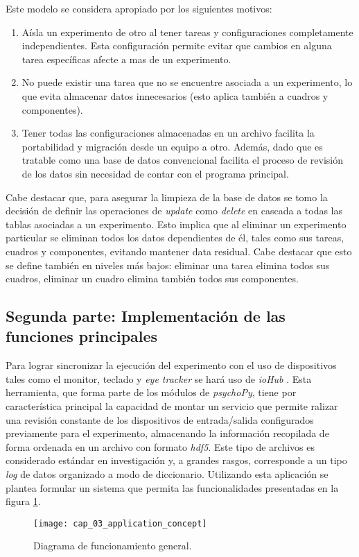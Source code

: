 \documentclass[\main/main.tex]{subfiles}
\begin{document}
			Este modelo se considera apropiado por los siguientes motivos:
			\begin{enumerate}\setlength\itemsep{-0.5em}
				\item Aísla un experimento de otro al tener tareas y configuraciones completamente independientes. Esta configuración permite evitar que cambios en alguna tarea específicas afecte a mas de un experimento.

				\item No puede existir una tarea que no se encuentre asociada a un experimento, lo que evita almacenar datos innecesarios (esto aplica también a cuadros y componentes). 

				\item Tener todas las configuraciones almacenadas en un archivo facilita la portabilidad y migración desde un equipo a otro. Además, dado que es tratable como una base de datos convencional facilita el proceso de revisión de los datos sin necesidad de contar con el programa principal.
			\end{enumerate}

			Cabe destacar que, para asegurar la limpieza de la base de datos se tomo la decisión de definir las operaciones de \textit{update} como \textit{delete} en cascada a todas las tablas asociadas a un experimento. Esto implica que al eliminar un experimento particular se eliminan todos los datos dependientes de él, tales como sus tareas, cuadros y componentes, evitando mantener data residual. Cabe destacar que esto se define también en niveles más bajos: eliminar una tarea elimina todos sus cuadros, eliminar un cuadro elimina también todos sus componentes.  

		\subsection{Segunda parte: Implementación de las funciones principales}
		\label{sub:03_implementacion_backtend}
			Para lograr sincronizar la ejecución del experimento con el uso de dispositivos tales como el monitor, teclado y \textit{eye tracker} se hará uso de \textit{ioHub} \cite{website:iohub}. Esta herramienta, que forma parte de los módulos de \textit{psychoPy}, tiene por característica principal la capacidad de montar un servicio que permite ralizar una revisión constante de los dispositivos de entrada/salida configurados previamente para el experimento, almacenando la información recopilada de forma ordenada en un archivo con formato \textit{hdf5}. Este tipo de archivos es considerado estándar en investigación y, a grandes rasgos, corresponde a un tipo \textit{\gls{log}} de datos organizado a modo de diccionario. Utilizando esta aplicación se plantea formular un sistema que permita las funcionalidades presentadas en la figura \ref{fig:03_application_concept}. 
			\begin{figure}[H]
				\centering
				\texttt{[image: cap\_03\_application\_concept]}
				\caption{Diagrama de funcionamiento general.}
				\label{fig:03_application_concept}
			\end{figure} 
\end{document}
